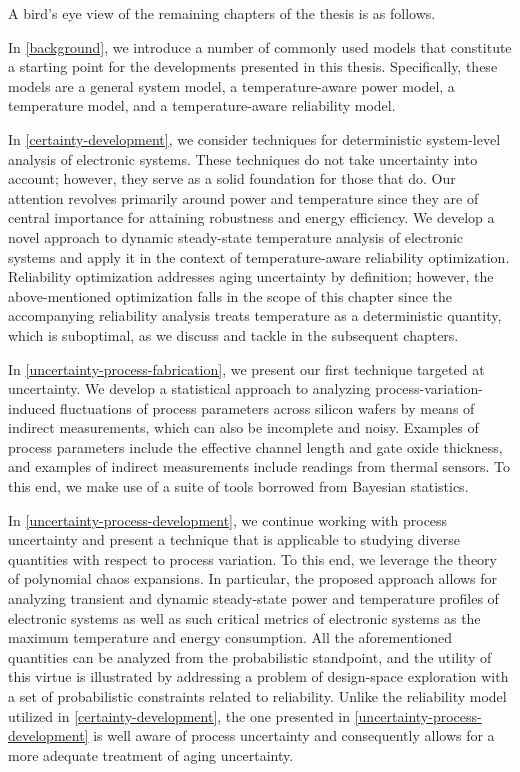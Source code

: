 A bird's eye view of the remaining chapters of the thesis is as follows.

In \cref{background}, we introduce a number of commonly used models that
constitute a starting point for the developments presented in this thesis.
Specifically, these models are a general system model, a temperature-aware power
model, a temperature model, and a temperature-aware reliability model.

In \cref{certainty-development}, we consider techniques for deterministic
system-level analysis of electronic systems. These techniques do not take
uncertainty into account; however, they serve as a solid foundation for those
that do. Our attention revolves primarily around power and temperature since
they are of central importance for attaining robustness and energy efficiency.
We develop a novel approach to dynamic steady-state temperature analysis of
electronic systems and apply it in the context of temperature-aware reliability
optimization. Reliability optimization addresses aging uncertainty by
definition; however, the above-mentioned optimization falls in the scope of this
chapter since the accompanying reliability analysis treats temperature as a
deterministic quantity, which is suboptimal, as we discuss and tackle in the
subsequent chapters.

In \cref{uncertainty-process-fabrication}, we present our first technique
targeted at uncertainty. We develop a statistical approach to analyzing
process-variation-induced fluctuations of process parameters across silicon
wafers by means of indirect measurements, which can also be incomplete and
noisy. Examples of process parameters include the effective channel length and
gate oxide thickness, and examples of indirect measurements include readings
from thermal sensors. To this end, we make use of a suite of tools borrowed from
Bayesian statistics.

In \cref{uncertainty-process-development}, we continue working with process
uncertainty and present a technique that is applicable to studying diverse
quantities with respect to process variation. To this end, we leverage the
theory of polynomial chaos expansions. In particular, the proposed approach
allows for analyzing transient and dynamic steady-state power and temperature
profiles of electronic systems as well as such critical metrics of electronic
systems as the maximum temperature and energy consumption. All the
aforementioned quantities can be analyzed from the probabilistic standpoint, and
the utility of this virtue is illustrated by addressing a problem of
design-space exploration with a set of probabilistic constraints related to
reliability. Unlike the reliability model utilized in
\cref{certainty-development}, the one presented in
\cref{uncertainty-process-development} is well aware of process uncertainty and
consequently allows for a more adequate treatment of aging uncertainty.

